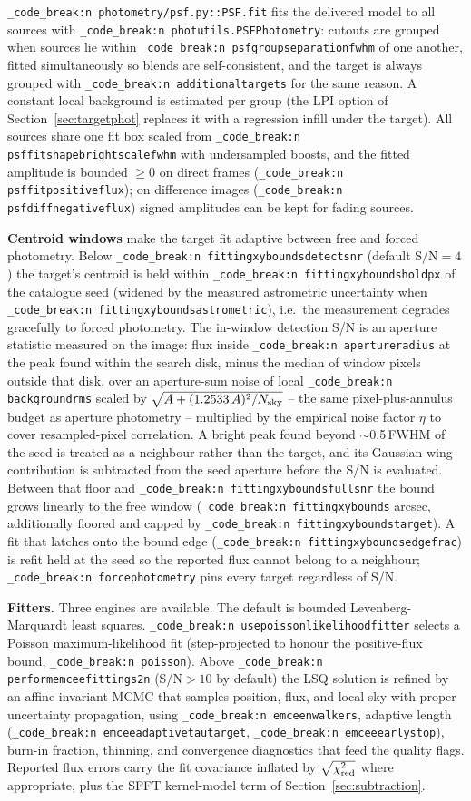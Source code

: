 \documentclass[11pt,a4paper]{article}
\renewcommand{\_}{\autophotunderscore\allowbreak}
\DeclareRobustCommand{\code}[1]{\texttt{\autophot_code_break:n {#1}}}
\begin{document}
\code{photometry/psf.py::PSF.fit} fits the delivered model to all sources
with \code{photutils.PSFPhotometry}: cutouts are grouped when sources lie
within \code{psf\_group\_separation\_fwhm} of one another, fitted
simultaneously so blends are self-consistent, and the target is always
grouped with \code{additional\_targets} for the same reason. A constant
local background is estimated per group (the LPI option of
Section~\ref{sec:targetphot} replaces it with a regression infill under
the target). All sources share one fit box scaled from
\code{psf\_fit\_shape\_bright\_scale\_fwhm} with undersampled boosts, and
the fitted amplitude is bounded $\ge0$ on direct frames
(\code{psf\_fit\_positive\_flux}); on difference images
(\code{psf\_diff\_negative\_flux}) signed amplitudes can be kept for
fading sources.

\textbf{Centroid windows} make the target fit adaptive between free and
forced photometry. Below \code{fitting\_xy\_bounds\_detect\_snr}
(default S/N$=4$) the target's centroid is held within
\code{fitting\_xy\_bounds\_hold\_px} of the catalogue seed (widened by the
measured astrometric uncertainty when
\code{fitting\_xy\_bounds\_astrometric}), i.e.\ the measurement degrades
gracefully to forced photometry. The in-window detection S/N is an
aperture statistic measured on the image: flux inside
\code{aperture\_radius} at the peak found within the search disk, minus
the median of window pixels outside that disk, over an aperture-sum
noise of local \code{background\_rms} scaled by
$\sqrt{A + (1.2533\,A)^{2}/N_{\rm sky}}$ -- the same pixel-plus-annulus
budget as aperture photometry -- multiplied by the empirical noise
factor $\eta$ to cover resampled-pixel correlation. A bright peak found
beyond $\sim$0.5\,FWHM of the seed is treated as a neighbour rather
than the target, and its Gaussian wing contribution is subtracted from
the seed aperture before the S/N is evaluated. Between that floor and
\code{fitting\_xy\_bounds\_full\_snr} the bound grows linearly to the
free window (\code{fitting\_xy\_bounds} arcsec, additionally floored and
capped by \code{fitting\_xy\_bounds\_target\_*}). A fit that latches onto
the bound edge (\code{fitting\_xy\_bounds\_edge\_frac}) is refit held at
the seed so the reported flux cannot belong to a neighbour;
\code{force\_photometry} pins every target regardless of S/N.

\textbf{Fitters.} Three engines are available. The default is bounded
Levenberg-Marquardt least squares. \code{use\_poisson\_likelihood\_fitter}
selects a Poisson maximum-likelihood fit (step-projected to honour the
positive-flux bound, \code{poisson\_*}). Above
\code{perform\_emcee\_fitting\_s2n} (S/N$>10$ by default) the LSQ solution
is refined by an affine-invariant MCMC \citep{foreman2013emcee} that
samples position, flux, and local sky with proper uncertainty
propagation, using \code{emcee\_nwalkers}, adaptive length
(\code{emcee\_adaptive\_tau\_target}, \code{emcee\_early\_stop}), burn-in
fraction, thinning, and convergence diagnostics that feed the quality
flags. Reported flux errors carry the fit covariance inflated by
$\sqrt{\chi^2_{\rm red}}$ where appropriate, plus the SFFT kernel-model
term of Section~\ref{sec:subtraction}.
\end{document}

